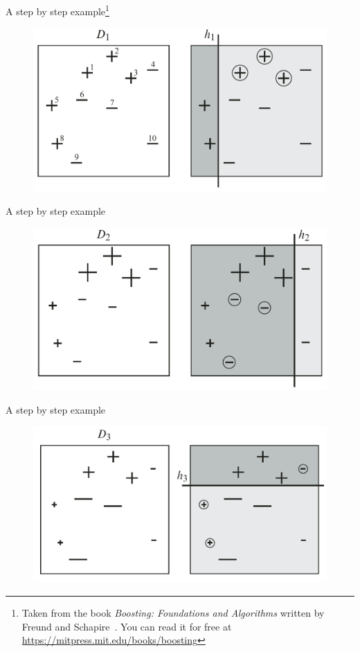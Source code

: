 \begin{frame}{A step by step example\footnote{Taken from the book \textit{Boosting: Foundations and Algorithms} written by Freund and Schapire~\cite{boosting}.
You can read it for free at \url{https://mitpress.mit.edu/books/boosting}}}
    \begin{figure}
        \includegraphics[width=\textwidth]{img/example_1}
    \end{figure}
\end{frame}

\begin{frame}{A step by step example}
    \begin{figure}
        \includegraphics[width=\textwidth]{img/example_2}
    \end{figure}
\end{frame}

\begin{frame}{A step by step example}
    \begin{figure}
        \includegraphics[width=\textwidth]{img/example_3}
    \end{figure}
\end{frame}

